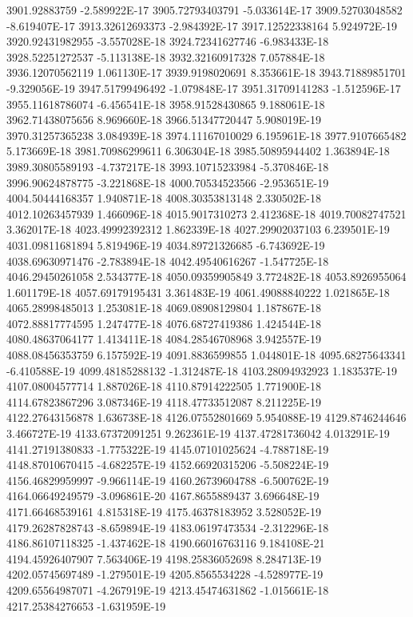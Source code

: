 3901.92883759  -2.589922E-17
3905.72793403791  -5.033614E-17
3909.52703048582  -8.619407E-17
3913.32612693373  -2.984392E-17
3917.12522338164  5.924972E-19
3920.92431982955  -3.557028E-18
3924.72341627746  -6.983433E-18
3928.52251272537  -5.113138E-18
3932.32160917328  7.057884E-18
3936.12070562119  1.061130E-17
3939.9198020691  8.353661E-18
3943.71889851701  -9.329056E-19
3947.51799496492  -1.079848E-17
3951.31709141283  -1.512596E-17
3955.11618786074  -6.456541E-18
3958.91528430865  9.188061E-18
3962.71438075656  8.969660E-18
3966.51347720447  5.908019E-19
3970.31257365238  3.084939E-18
3974.11167010029  6.195961E-18
3977.9107665482  5.173669E-18
3981.70986299611  6.306304E-18
3985.50895944402  1.363894E-18
3989.30805589193  -4.737217E-18
3993.10715233984  -5.370846E-18
3996.90624878775  -3.221868E-18
4000.70534523566  -2.953651E-19
4004.50444168357  1.940871E-18
4008.30353813148  2.330502E-18
4012.10263457939  1.466096E-18
4015.9017310273  2.412368E-18
4019.70082747521  3.362017E-18
4023.49992392312  1.862339E-18
4027.29902037103  6.239501E-19
4031.09811681894  5.819496E-19
4034.89721326685  -6.743692E-19
4038.69630971476  -2.783894E-18
4042.49540616267  -1.547725E-18
4046.29450261058  2.534377E-18
4050.09359905849  3.772482E-18
4053.8926955064  1.601179E-18
4057.69179195431  3.361483E-19
4061.49088840222  1.021865E-18
4065.28998485013  1.253081E-18
4069.08908129804  1.187867E-18
4072.88817774595  1.247477E-18
4076.68727419386  1.424544E-18
4080.48637064177  1.413411E-18
4084.28546708968  3.942557E-19
4088.08456353759  6.157592E-19
4091.8836599855  1.044801E-18
4095.68275643341  -6.410588E-19
4099.48185288132  -1.312487E-18
4103.28094932923  1.183537E-19
4107.08004577714  1.887026E-18
4110.87914222505  1.771900E-18
4114.67823867296  3.087346E-19
4118.47733512087  8.211225E-19
4122.27643156878  1.636738E-18
4126.07552801669  5.954088E-19
4129.8746244646  3.466727E-19
4133.67372091251  9.262361E-19
4137.47281736042  4.013291E-19
4141.27191380833  -1.775322E-19
4145.07101025624  -4.788718E-19
4148.87010670415  -4.682257E-19
4152.66920315206  -5.508224E-19
4156.46829959997  -9.966114E-19
4160.26739604788  -6.500762E-19
4164.06649249579  -3.096861E-20
4167.8655889437  3.696648E-19
4171.66468539161  4.815318E-19
4175.46378183952  3.528052E-19
4179.26287828743  -8.659894E-19
4183.06197473534  -2.312296E-18
4186.86107118325  -1.437462E-18
4190.66016763116  9.184108E-21
4194.45926407907  7.563406E-19
4198.25836052698  8.284713E-19
4202.05745697489  -1.279501E-19
4205.8565534228  -4.528977E-19
4209.65564987071  -4.267919E-19
4213.45474631862  -1.015661E-18
4217.25384276653  -1.631959E-19
